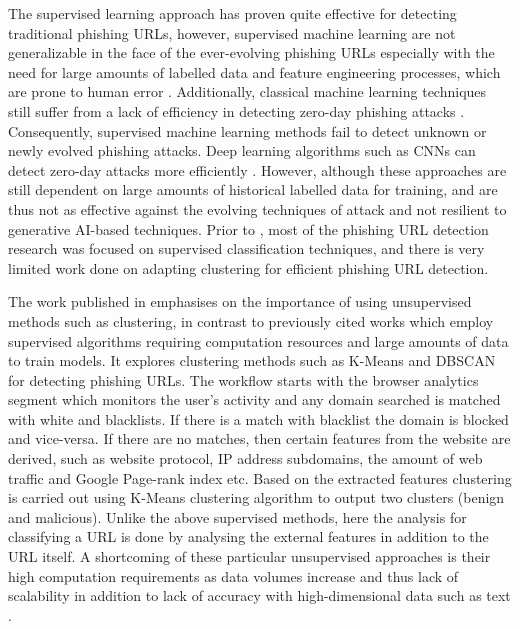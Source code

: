 The supervised learning approach has proven quite effective for detecting traditional phishing URLs, however, supervised machine learning are not generalizable in the face of the ever-evolving phishing URLs especially with the need for large amounts of labelled data and feature engineering processes, which are prone to human error \cite{b11}. Additionally, classical machine learning techniques still suffer from a lack of efficiency in detecting zero-day phishing attacks \cite{b12}. Consequently, supervised machine learning methods fail to detect unknown or newly evolved phishing attacks. Deep learning algorithms such as CNNs can detect zero-day attacks more efficiently \cite{b13}. However, although these approaches are still dependent on large amounts of historical labelled data for training, and are thus not as effective against the evolving techniques of attack and not resilient to generative AI-based techniques. Prior to \cite{b10}, most of the phishing URL detection research was focused on supervised classification techniques, and there is very limited work done on adapting clustering for efficient phishing URL detection.

The work published in \cite{b10} emphasises on the importance of using unsupervised methods such as clustering, in contrast to previously cited works which employ supervised algorithms requiring computation resources and large amounts of data to train models. It explores clustering methods such as K-Means and DBSCAN for detecting phishing URLs. The workflow starts with the browser analytics segment which monitors the user’s activity and any domain searched is matched with white and blacklists. If there is a match with blacklist the domain is blocked and vice-versa. If there are no matches, then certain features from the website are derived, such as website protocol, IP address subdomains, the amount of web traffic and Google Page-rank index etc. Based on the extracted features clustering is carried out using K-Means clustering algorithm to output two clusters (benign and malicious). Unlike the above supervised methods, here the analysis for classifying a URL is done by analysing the external features in addition to the URL itself. A shortcoming of these particular unsupervised approaches is their high computation requirements as data volumes increase and thus lack of scalability in addition to lack of accuracy with high-dimensional data such as text \cite{b22}.

